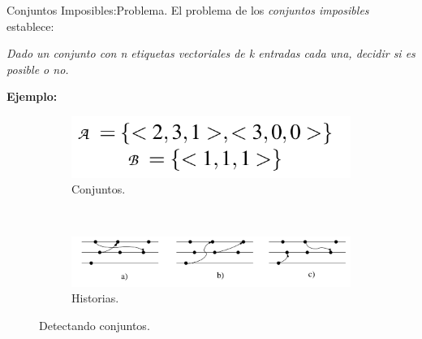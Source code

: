 \begin{frame}[fragile]{Conjuntos Imposibles:}{Problema.}
  \justifying
  El problema de los \textit{conjuntos imposibles} establece:
  \begin{center}
    \textit{Dado un conjunto con n etiquetas vectoriales de k entradas cada una, decidir si
    es posible o no.}
  \end{center}

  \textbf{Ejemplo:}
  \begin{figure}
    \centering
    \begin{subfigure}[b]{0.3\textwidth}
      \includegraphics[width=\textwidth]{./Imagenes/Conjuntos}
        \caption{Conjuntos.}
        \label{fig:Conjuntos.}
    \end{subfigure}
    ~ %
    \begin{subfigure}[b]{0.7\textwidth}
        \includegraphics[width=\textwidth]{./Imagenes/Historia}
        \caption{Historias.}
        \label{fig:Historias.}
    \end{subfigure}
    \caption{Detectando conjuntos.}\label{fig:ConjuntosImposibles.}
  \end{figure}
\end{frame}
